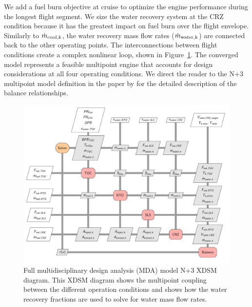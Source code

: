 \documentclass[conf]{new-aiaa}
\begin{document}
We add a fuel burn objective at cruise to optimize the engine performance during the longest flight segment.
We size the water recovery system at the CRZ condition because it has the greatest impact on fuel burn over the flight envelope.
Similarly to $\dot{m}_{\rm{cool},k}$, the water recovery mass flow rates ($\dot{m}_{\rm{water},k}$) are connected back to the other operating points.
The interconnections between flight conditions create a complex nonlinear loop, shown in Figure~\ref{fig:N3_xdsm_full}.
The converged model represents a feasible multipoint engine that accounts for design considerations at all four operating conditions.
We direct the reader to the N+3 multipoint model definition in the paper by \citet{Hendricks2019} for the detailed description of the balance relationships.

\begin{figure}[hbt!]
    \centering
    \includegraphics[width=\textwidth]{N3_xdsm_full.pdf}
    \caption{
        Full multidisciplinary design analysis (MDA) model N+3 XDSM diagram.
        This XDSM diagram shows the multipoint coupling between the different operation conditions and shows how the water recovery fractions are used to solve for water mass flow rates.
    }
    \label{fig:N3_xdsm_full}
\end{figure}
\end{document}
